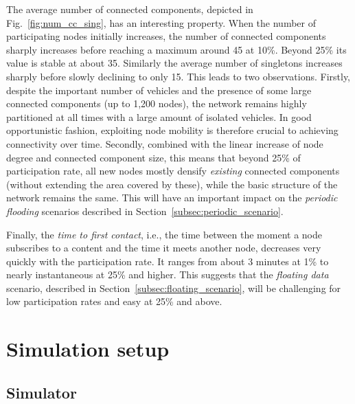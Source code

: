\documentclass[preprint]{elsarticle}
\begin{document}
The average number of connected components, depicted in Fig.~\ref{fig:num_cc_sing}, has an interesting property. When the number of participating nodes initially increases, the number of connected components sharply increases before reaching a maximum around 45 at 10\%. Beyond 25\% its value is stable at about 35.  Similarly the average number of singletons increases sharply before slowly declining to only 15. This leads to two observations. Firstly,  despite the important number of vehicles and the presence of some large connected components (up to 1,200 nodes), the network remains highly partitioned at all times with a large amount of isolated vehicles. In good opportunistic fashion, exploiting node mobility is therefore crucial to achieving connectivity over time. Secondly, combined with the linear increase of node degree and connected component size, this means that beyond 25\% of participation rate, all new nodes mostly densify \emph{existing} connected components (without extending the area covered by these), while the basic structure of the network remains the same. This will have an important impact on the \emph{periodic flooding} scenarios described in Section~\ref{subsec:periodic_scenario}.

Finally, the \emph{time to first contact}, i.e., the time between the moment a node subscribes to a content and the time it meets another node, decreases very quickly with the participation rate. It ranges from about 3 minutes at 1\% to nearly instantaneous at 25\% and higher. This suggests that the \emph{floating data} scenario, described in Section~\ref{subsec:floating_scenario}, will be challenging for low participation rates and easy at 25\% and above.


\section{Simulation setup}
\label{sec:setup}

\subsection{Simulator}
\label{subsec:simulator}
\end{document}

